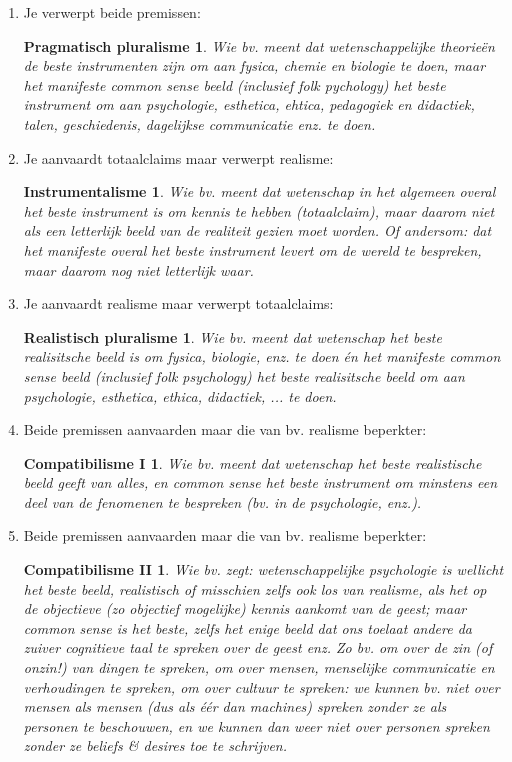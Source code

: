 \documentclass[11pt,a4paper]{article}
\begin{document}
\begin{enumerate}
\item[i.] Je verwerpt beide premissen:
\newtheorem*{def1}{Pragmatisch pluralisme}
\begin{def1}
Wie bv. meent dat wetenschappelijke theorie\"en de beste instrumenten zijn om aan fysica, chemie en biologie te doen, maar het manifeste common sense beeld (inclusief folk pychology) het beste instrument om aan psychologie, esthetica, ehtica, pedagogiek en didactiek, talen, geschiedenis, dagelijkse communicatie enz. te doen.
\end{def1}

\item[ii.] Je aanvaardt totaalclaims maar verwerpt realisme:
\newtheorem*{def2}{Instrumentalisme}
\begin{def2}
Wie bv. meent dat wetenschap in het algemeen overal het beste instrument is om kennis te hebben (totaalclaim), maar daarom niet als een letterlijk beeld van de realiteit gezien moet worden. Of andersom: dat het manifeste overal het beste instrument levert om de wereld te bespreken, maar daarom nog niet letterlijk waar.
\end{def2}

\item[iii.] Je aanvaardt realisme maar verwerpt totaalclaims:
\newtheorem*{def3}{Realistisch pluralisme}
\begin{def3}
Wie bv. meent dat wetenschap het beste realisitsche beeld is om fysica, biologie, enz. te doen \'en het manifeste common sense beeld (inclusief folk psychology) het beste realisitsche beeld om aan psychologie, esthetica, ethica, didactiek, ... te doen.
\end{def3}

\item[iv.] Beide premissen aanvaarden maar die van bv. realisme beperkter:
\newtheorem*{def4}{Compatibilisme I}
\begin{def4}
Wie bv. meent dat wetenschap het beste realistische beeld geeft van alles, en common sense het beste instrument om minstens een deel van de fenomenen te bespreken (bv. in de psychologie, enz.).
\end{def4}
\item[v.] Beide premissen aanvaarden maar die van bv. realisme beperkter:
\newtheorem*{def5}{Compatibilisme II}
\begin{def5}
Wie bv. zegt: wetenschappelijke psychologie is wellicht het beste beeld, realistisch of misschien zelfs ook los van realisme, als het op de objectieve (zo objectief mogelijke) kennis aankomt van de geest; maar common sense is het beste, zelfs het enige beeld dat ons toelaat andere da zuiver cognitieve taal te spreken over de geest enz. Zo bv. om over de zin (of onzin!) van dingen te spreken, om over mensen, menselijke communicatie en verhoudingen te spreken, om over cultuur te spreken: we kunnen bv. niet over mensen als mensen (dus als \'e\'er dan machines) spreken zonder ze als personen te beschouwen, en we kunnen dan weer niet over personen spreken zonder ze beliefs \& desires toe te schrijven.
\end{def5}
\end{enumerate}
\end{document}
